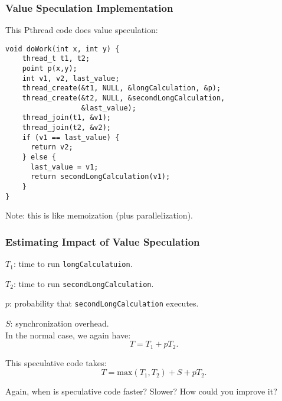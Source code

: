 \begin{frame}[fragile]
  \frametitle{Value Speculation Implementation}

  
  This Pthread code does value speculation:
  
  \begin{lstlisting}
void doWork(int x, int y) {
    thread_t t1, t2;
    point p(x,y);
    int v1, v2, last_value;
    thread_create(&t1, NULL, &longCalculation, &p);
    thread_create(&t2, NULL, &secondLongCalculation,
                  &last_value);
    thread_join(t1, &v1);
    thread_join(t2, &v2);
    if (v1 == last_value) {
      return v2;
    } else {
      last_value = v1;
      return secondLongCalculation(v1);
    }
}
  \end{lstlisting}

  Note: this is like memoization (plus parallelization).
  
\end{frame}

\begin{frame}
  \frametitle{Estimating Impact of Value Speculation}

  
  $T_1$: time to run {\tt longCalculatuion}.

  $T_2$: time to run {\tt secondLongCalculation}.

  $p$: probability that {\tt secondLongCalculation} executes.

  $S$: synchronization overhead.\\[1em]

  In the normal case, we again have:
    \[ T = T_1 +pT_2.\]

  This speculative code takes:
    \[ T = \mbox{max}(T_1, T_2) + S + pT_2.\]

     Again, when is speculative code faster? Slower? How could you improve it?

  
\end{frame}

